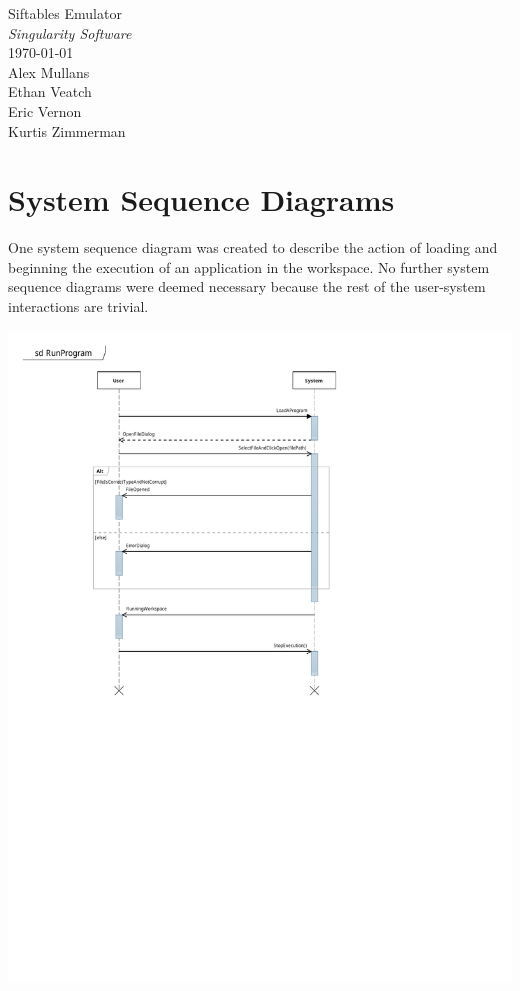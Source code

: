 \documentclass[12pt]{article}
\begin{document}
\vspace*{\fill}
        \begin{center}
                \LARGE{Siftables Emulator} \\
                \LARGE{\textit{Singularity Software}} \\
                \vspace{.15in}
                \large{\today} \\
                \vspace{4in}
                        Alex Mullans \\
                        Ethan Veatch \\
                        Eric Vernon \\
                        Kurtis Zimmerman
        \end{center}
\vspace*{\fill}
\thispagestyle{empty}

\section{System Sequence Diagrams}
One system sequence diagram was created to describe the action of loading and beginning the execution of an application in the workspace.  No further system sequence diagrams were deemed necessary because the rest of the user-system interactions are trivial.
\begin{center}
        \includegraphics[scale=1]{./pdfs/Models/SSD - RunProgram.pdf}
\end{center}
\end{document}
